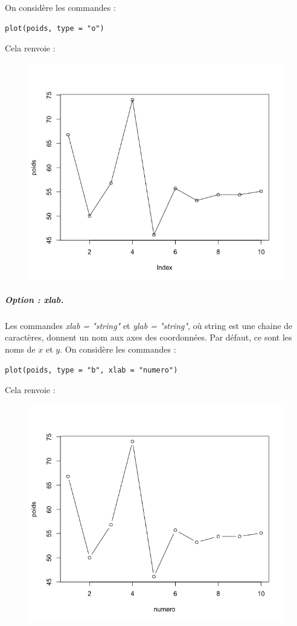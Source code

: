 On considère les commandes :
\begin{lstlisting}[language=html]
plot(poids, type = "o")
\end{lstlisting}
Cela renvoie :
\begin{figure}[H]\begin{center}\includegraphics[scale=0.4]{ilu/gra11.png}\end{center}\end{figure}
\subparagraph{Option : xlab.} 
Les commandes \textit{xlab = "string"} et \textit{ylab = "string"}, où string est une chaine de caractères, donnent un nom aux axes des coordonnées. Par défaut, ce sont les noms de $x$ et $y$.\newline
On considère les commandes :
\begin{lstlisting}[language=html]
plot(poids, type = "b", xlab = "numero")
\end{lstlisting}
Cela renvoie :
\begin{figure}[H]\begin{center}\includegraphics[scale=0.4]{ilu/gra12.png}\end{center}\end{figure}

